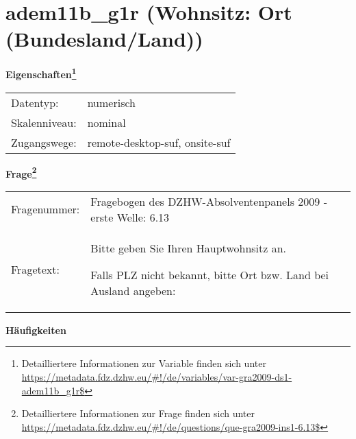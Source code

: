 
    \setcounter{footnote}{0}

    \vspace*{-1.8cm}
	\section{adem11b\_g1r (Wohnsitz: Ort (Bundesland/Land))}
	\label{section:adem11b_g1r}



    \vspace*{0.5cm}
    \noindent\textbf{Eigenschaften\footnote{Detailliertere Informationen zur Variable finden sich unter
		\url{https://metadata.fdz.dzhw.eu/\#!/de/variables/var-gra2009-ds1-adem11b_g1r$}}}\\
	\begin{tabularx}{\hsize}{@{}lX}
	Datentyp: & numerisch \\
	Skalenniveau: & nominal \\
	Zugangswege: &
	  remote-desktop-suf, 
	  onsite-suf
 \\
    \end{tabularx}



				\vspace*{0.5cm}
                \noindent\textbf{Frage\footnote{Detailliertere Informationen zur Frage finden sich unter
		              \url{https://metadata.fdz.dzhw.eu/\#!/de/questions/que-gra2009-ins1-6.13$}}}\\
				\begin{tabularx}{\hsize}{@{}lX}
					Fragenummer: &
					  Fragebogen des DZHW-Absolventenpanels 2009 - erste Welle:
					  6.13
 \\
					Fragetext: & Bitte geben Sie Ihren Hauptwohnsitz an.\par  Falls PLZ nicht bekannt, bitte Ort bzw. Land bei Ausland angeben: \\
				\end{tabularx}





        		\vspace*{0.5cm}
                \noindent\textbf{Häufigkeiten}


